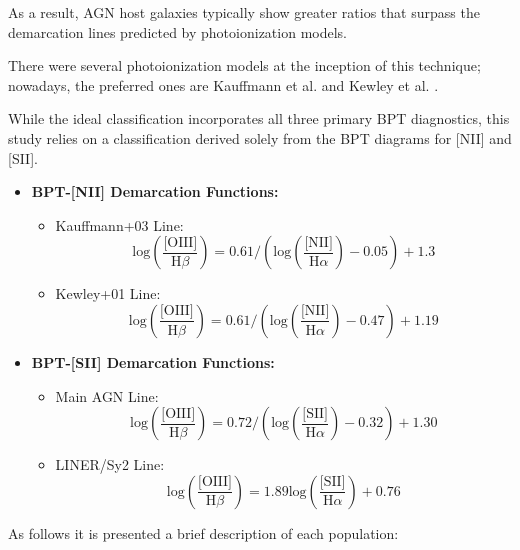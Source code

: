As a result, AGN host galaxies typically show greater ratios that surpass the demarcation lines predicted by photoionization models.

There were several photoionization models at the inception of this technique; nowadays, the preferred ones are Kauffmann et al. \cite{2003MNRAS.346.1055K} and Kewley et al. \cite{2001ApJ...556..121K}.

While the ideal classification incorporates all three primary BPT diagnostics, this study relies on a classification derived solely from the BPT diagrams for [NII] and [SII].

\begin{itemize}
    \item \textbf{BPT-[NII] Demarcation Functions:}
    \begin{itemize}
        \item Kauffmann+03 Line: \[ \text{log}(\frac{\text{[OIII]}}{\text{H}\beta}) = 0.61 / (\text{log}(\frac{\text{[NII]}}{\text{H}\alpha}) - 0.05) + 1.3 \]
        \item Kewley+01 Line: \[ \text{log}(\frac{\text{[OIII]}}{\text{H}\beta}) = 0.61 / (\text{log}(\frac{\text{[NII]}}{\text{H}\alpha}) - 0.47) + 1.19 \]
    \end{itemize}

    \item \textbf{BPT-[SII] Demarcation Functions:}
    \begin{itemize}
        \item Main AGN Line: \[ \text{log}(\frac{\text{[OIII]}}{\text{H}\beta}) = 0.72 / (\text{log}(\frac{\text{[SII]}}{\text{H}\alpha}) - 0.32) + 1.30 \]
        \item LINER/Sy2 Line: \[ \text{log}(\frac{\text{[OIII]}}{\text{H}\beta}) = 1.89 \text{log}(\frac{\text{[SII]}}{\text{H}\alpha}) + 0.76 \]
    \end{itemize}
\end{itemize}

As follows it is presented a brief description of each population:

